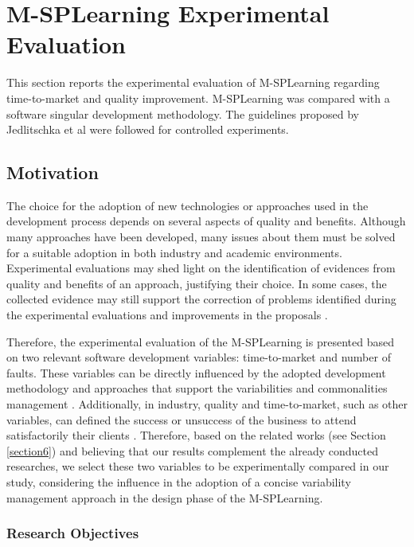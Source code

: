 
\section{M-SPLear\allowbreak ning Experimental Evaluation}\label{section4}

This section reports the experimental evaluation of M-SPLear\allowbreak ning regarding time-to-market and quality improvement. M-SPLear\allowbreak ning was compared with a software singular development methodology. The guidelines proposed by Jedlitschka et al \cite{jedlitschka07} were followed for controlled experiments.

\subsection{Motivation}\label{sub:motivation}


The choice for the adoption of new technologies or approaches used in the development process depends on several aspects of quality and benefits. Although many approaches have been developed, many issues about them must be solved for a suitable adoption in both industry and academic environments. Experimental evaluations may shed light on the identification of evidences from quality and benefits of an approach, justifying their choice. In some cases, the collected evidence may still support the correction of problems identified during the experimental evaluations and improvements in the proposals \cite{wohlin12,juristo10}.

Therefore, the experimental evaluation of the M-SPLear\allowbreak ning is presented based on two relevant software development variables: time-to-market and number of faults. These variables can be directly influenced by the adopted development methodology and approaches that support the variabilities and commonalities management \cite{hubaux10,capilla13}. Additionally, in industry, quality and time-to-market, such as other variables, can defined the success or unsuccess of the business to attend satisfactorily their clients \cite{hubaux10}. Therefore, based on the related works (see Section \ref{section6}) and believing that our results complement the already conducted researches, we select these two variables to be experimentally compared in our study, considering the influence in the adoption of a concise variability management approach in the design phase of the M-SPLear\allowbreak ning.


\subsubsection{Research Objectives}\label{sub:object}

